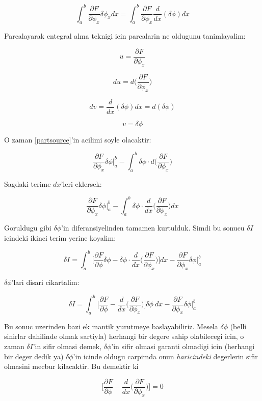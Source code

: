 \documentclass[12pt,fleqn]{article}\usepackage{../common}
\begin{document}
\begin{equation} 
\int_{a}^{b} \frac{\partial F}{\partial \phi_x}\delta\phi_x dx =
\int_{a}^{b} \frac{\partial F}{\partial \phi_x} \frac{d}{dx}(\delta \phi) dx \label{partsource}
\end{equation} 

Parcalayarak entegral alma teknigi icin parcalarin ne oldugunu tanimlayalim:

\[ u = \frac{\partial F}{\partial \phi_x}  \]

\[ du  = d \bigg( \frac{\partial F}{\partial \phi_x} \bigg) \]

\[ dv  = \frac{d}{dx}(\delta \phi)dx = d(\delta \phi) \]

\[ v  = \delta \phi \]

O zaman \ref{partsource}'in acilimi soyle olacaktir:

\[ 
\frac{\partial F}{\partial \phi_x} \delta \phi \bigg|_a^b - 
\int_a^b \delta \phi \cdot d \bigg( \frac{\partial F}{\partial \phi_x} \bigg)
 \]

Sagdaki terime $dx$'leri eklersek:

\[ 
\frac{\partial F}{\partial \phi_x} \delta \phi \bigg|_a^b - 
\int_a^b \delta \phi \cdot \frac{d}{dx} \bigg( \frac{\partial F}{\partial \phi_x} \bigg) dx
 \]

Goruldugu gibi $\delta \phi$'in diferansiyelinden tamamen kurtulduk. Simdi bu
sonucu $\delta I$ icindeki ikinci terim yerine koyalim:

\[ 
\delta I  = \int_{a}^{b} 
\bigg[ \frac{\partial F}{\partial \phi}\delta\phi -
\delta \phi \cdot \frac{d}{dx} \bigg( \frac{\partial F}{\partial \phi_x} \bigg)
\bigg] dx - \frac{\partial F}{\partial \phi_x} \delta \phi \bigg|_a^b 
 \]

$\delta \phi$'lari disari cikartalim:

\[ 
\delta I  = \int_{a}^{b} \bigg[
\frac{\partial F}{\partial \phi} -
\frac{d}{dx} \bigg( \frac{\partial F}{\partial \phi_x} \bigg)
\bigg] \delta\phi \ dx
- \frac{\partial F}{\partial \phi_x} \delta \phi \bigg|_a^b 
 \]

Bu sonuc uzerinden bazi ek mantik yurutmeye baslayabiliriz. Mesela $\delta \phi$
(belli sinirlar dahilinde olmak sartiyla) herhangi bir degere sahip olabilecegi
icin, o zaman $\delta I$'in sifir olmasi demek, $\delta \phi$'in sifir olmasi
garanti olmadigi icin (herhangi bir deger dedik ya) $\delta \phi$'in icinde
oldugu carpimda onun {\em haricindeki} degerlerin sifir olmasini mecbur
kilacaktir. Bu demektir ki

\[ 
\bigg[
\frac{\partial F}{\partial \phi} -
\frac{d}{dx} \bigg( \frac{\partial F}{\partial \phi_x} \bigg)
\bigg] = 0
 \]
\end{document}
